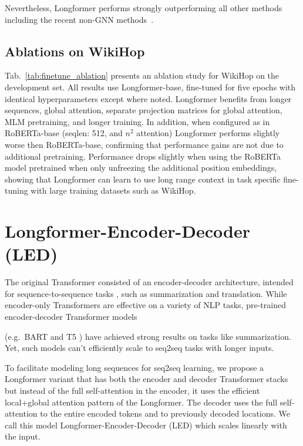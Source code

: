 Nevertheless, Longformer performs strongly outperforming all other methods including the recent non-GNN methods~\cite{Gla2019SpanSP,Shao2020IsGS,quark2020}.

\subsection{Ablations on WikiHop}

Tab.~\ref{tab:finetune_ablation} presents an ablation study for WikiHop on the development set. All results use Longformer-base, fine-tuned for five epochs with identical hyperparameters except where noted.  Longformer benefits from longer sequences, global attention, separate projection matrices for global attention, MLM pretraining, and longer training.  In addition, when configured as in RoBERTa-base (seqlen: 512, and $n^2$ attention) Longformer performs slightly worse then RoBERTa-base, confirming that performance gains are not due to additional pretraining.  Performance drops slightly when using the RoBERTa model pretrained when only unfreezing the additional position embeddings, showing that Longformer can learn to use long range context in task specific fine-tuning with large training datasets such as WikiHop.

\section{Longformer-Encoder-Decoder (LED)}
\label{sec:led}

The original Transformer \cite{Vaswani2017AttentionIA} consisted of an encoder-decoder architecture, intended for sequence-to-sequence tasks \cite{Sutskever2014SequenceTS}, such as summarization and translation. While encoder-only Transformers are effective on a variety of NLP tasks, pre-trained encoder-decoder Transformer models

(e.g.\ BART \cite{lewis-etal-2020-bart} and T5 \cite{Raffel2020ExploringTL}) have achieved strong results on tasks like summarization. Yet, such models can't efficiently scale to seq2seq tasks with longer inputs.

To facilitate modeling long sequences for seq2seq learning, we propose a Longformer variant that has both the encoder and decoder Transformer stacks but instead of the full self-attention in the encoder, it uses the efficient local+global attention pattern of the Longformer.  The decoder uses the full self-attention to the entire encoded tokens and to previously decoded locations. We call this model Longformer-Encoder-Decoder (LED) which scales linearly with the input.

